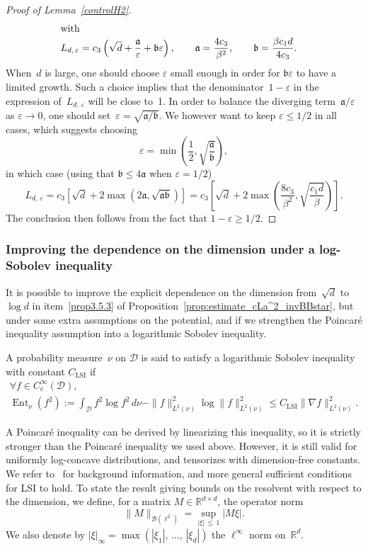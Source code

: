 \documentclass[AHL,Unicode,longabstracts,MathTools,published]{cedram}
\newcommand{\rmc}{\mathrm{c}}
\newcommand{\LSI}{\mathrm{LSI}}
\DeclareMathOperator{\Ent}{Ent}
\newcommand{\cB}{\mathcal{B}}
\newcommand{\cD}{\mathcal{D}}
\newcommand{\R}{\mathbb{R}}
\newcommand{\frka}{\mathfrak{a}}
\newcommand{\frkb}{\mathfrak{b}}
\renewcommand{\leq}{\leqslant}
\renewcommand{\geq}{\geqslant}
\let\oldforall\forall
\renewcommand*{\forall}{\mathrel{\oldforall}}
\begin{document}
\begin{proof}[Proof of Lemma~\ref{controlH2}]
\begin{align*}
\intertext{with}
L_{d,\,\varepsilon} &= c_3\left(\sqrt{d}+\frac{\frka}{\varepsilon} + \frkb \varepsilon \right),
\qquad
\frka = \frac{4c_3}{\beta^2}, \qquad \frkb = \frac{\beta c_1 d}{4 c_3}.
\end{align*}
When~$d$ is large, one should choose $\varepsilon$ small enough in order for $\frkb\varepsilon$ to have a limited growth. Such a choice implies that the denominator~$1-\varepsilon$ in the expression of~$L_{d,\,\varepsilon}$ will be close to~1. In order to balance the diverging term~$\frka/\varepsilon$ as $\varepsilon \to 0$, one should set~$\varepsilon = \sqrt{\frka/\frkb}$. We however want to keep $\varepsilon \leq 1/2$ in all cases, which suggests choosing
\[
\varepsilon = \min\left(\frac12, \sqrt{\frac{\frka}{\frkb}}\right),
\]
in which case (using that $\frkb \leq 4\frka$ when $\varepsilon = 1/2$)
\[
L_{d,\,\varepsilon} = c_3\left[\sqrt{d}+2 \max\left(2\frka, \sqrt{\frka\frkb} \right)\right] = c_3\left[\sqrt{d}+2\max\left(\frac{8c_3}{\beta^2},\sqrt{\frac{c_1 d}{\beta}}\right) \right].
\]
The conclusion then follows from the fact that $1-\varepsilon \geq 1/2$.
\end{proof}


\subsubsection{Improving the dependence on the dimension under a log-Sobolev inequality}\label{sec:scaling_dimension_Langevin_improved}

It is possible to improve the explicit dependence on the dimension from~$\sqrt{d}$ to~$\log d$ in item~\eqref{prop3.5.3} of Proposition~\ref{prop:estimate_cLa^2_invBBstar}, but under some extra assumptions on the potential, and if we strengthen the Poincaré inequality assumption into a logarithmic Sobolev inequality.

\begin{defi}
A probability measure~$\nu$ on $\cD$ is said to satisfy a logarithmic Sobolev inequality with constant $C_{\LSI}$ if
\begin{multline*}
\forall f \in C_\rmc^\infty(\cD), \\ \Ent_{\nu}\left(f^2\right) := \int_{\cD} f^2\log f^2 \, d\nu - \|f\|_{L^2(\nu)}^2\log \|f\|_{L^2(\nu)}^2 \leq C_{\LSI}\|\nabla f\|_{L^2(\nu)}^2.
\end{multline*}
\end{defi}

A Poincaré inequality can be derived by linearizing this inequality, so it is strictly stronger than the Poincaré inequality we used above. However, it is still valid for uniformly log-concave distributions, and tensorizes with dimension-free constants. We refer to~\cite{Led99} for background information, and more general sufficient conditions for LSI to hold. To state the result giving bounds on the resolvent with respect to the dimension, we define, for a matrix $M \in \R^{d \times d}$, the operator norm
\[
\|M\|_{\cB\left(\ell^2\right)} = \sup_{|\xi|\,\leq\,1} |M\xi|.
\]
We also denote by $|\xi|_\infty = \max(|\xi_1|,\,\dots,\,|\xi_d|)$ the $\ell^\infty$ norm on~$\R^d$.
\end{document}
